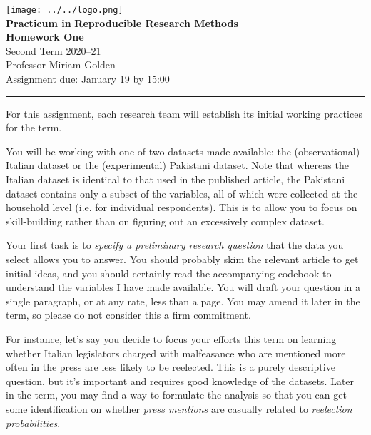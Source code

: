 \documentclass[11pt,a4paper]{article}
\begin{document}
\thispagestyle{plain}



{\texttt{[image: ../../logo.png]}}\\

{\LARGE 
\textbf{Practicum in} 
\textbf{Reproducible Research Methods}}\\

\textbf{Homework One}\\
Second Term 2020--21\\
Professor Miriam Golden \\
Assignment due: January 19 by 15:00

\noindent\rule{6.0in}{0.4pt}	%

For this assignment, each research team will establish its initial working practices for the term.

You will be working with one of two datasets made available: the (observational) Italian dataset or the (experimental) Pakistani dataset. Note that whereas the Italian dataset is identical to that used in the published article, the Pakistani dataset contains only a subset of the variables, all of which were collected at the household level (i.e. for individual respondents). This is to allow you to focus on skill-building rather than on figuring out an excessively complex dataset. 

Your first task is to {\it specify a preliminary research question} that the data you select allows you to answer. You should probably skim the relevant article to get initial ideas, and you should certainly read the accompanying codebook to understand the variables I have made available. You will draft your question in a single paragraph, or at any rate, less than a page. You may amend it later in the term, so please do not consider this a firm commitment.  

For instance, let's say you decide to focus your efforts this term on learning whether Italian legislators charged with malfeasance who are mentioned more often in the press are less likely to be reelected.
This is a purely descriptive question, but it's important and requires good knowledge of the datasets. Later in the term, you may find a way to formulate the analysis so that you can get some identification on whether {\it press mentions} are casually related to {\it reelection probabilities}. 
\end{document}
